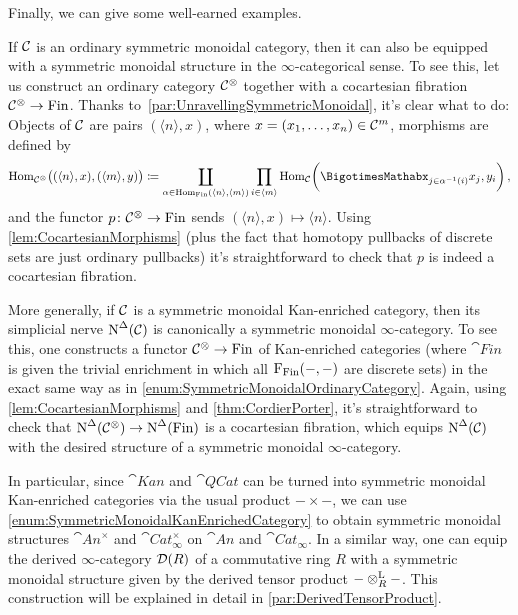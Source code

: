 \begin{exm}\label{exm:SymmetricMonoidal}
	Finally, we can give some well-earned examples.
	\begin{alphanumerate}
		\item If $\mathcal{C}$ is an ordinary symmetric monoidal category, then it can also be equipped with a symmetric monoidal structure in the $\infty$-categorical sense. To see this, let us construct an ordinary category $\mathcal{C}^\otimes$ together with a cocartesian fibration $\mathcal{C}^\otimes\rightarrow \mathrm{Fin}$. Thanks to~\cref{par:UnravellingSymmetricMonoidal}, it's clear what to do: Objects of $\mathcal{C}$ are pairs $(\langle n\rangle, x)$, where $x=(x_1,\dotsc,x_n)\in \mathcal{C}^m$, morphisms are defined by\label{enum:SymmetricMonoidalOrdinaryCategory}
		\begin{equation*}
			\Hom_{\Cc^\otimes}\bigl((\langle n\rangle,x),(\langle m\rangle,y)\bigr)\coloneqq \coprod_{\alpha\in \Hom_{\cat{Fin}}(\langle n\rangle,\langle m\rangle)}\prod_{i\in\langle m\rangle}\Hom_\Cc\biggl(\bigotimes_{j\in\alpha^{-1}(i)}x_j,y_i\biggr)\,,
		\end{equation*}
		and the functor $p\colon \mathcal{C}^\otimes\rightarrow \mathrm{Fin}$ sends $(\langle n\rangle ,x)\mapsto \langle n\rangle$. Using \cref{lem:CocartesianMorphisms} (plus the fact that homotopy pullbacks of discrete sets are just ordinary pullbacks) it's straightforward to check that $p$ is indeed a cocartesian fibration.
		\item More generally, if $\mathcal{C}$ is a symmetric monoidal Kan-enriched category, then its simplicial nerve $\operatorname{N}^\Delta(\mathcal{C})$ is canonically a symmetric monoidal $\infty$-category. To see this, one constructs a functor $\mathcal{C}^\otimes\rightarrow \mathrm{Fin}$ of Kan-enriched categories (where $\cat{Fin}$ is given the trivial enrichment in which all $\operatorname{F}_{\mathrm{Fin}}(-,-)$ are discrete sets) in the exact same way as in \cref{enum:SymmetricMonoidalOrdinaryCategory}. Again, using \cref{lem:CocartesianMorphisms} and \cref{thm:CordierPorter}, it's straightforward to check that $\operatorname{N}^\Delta(\mathcal{C}^\otimes)\rightarrow \operatorname{N}^\Delta(\mathrm{Fin})$ is a cocartesian fibration, which equips $\operatorname{N}^\Delta(\mathcal{C})$ with the desired structure of a symmetric monoidal $\infty$-category.\label{enum:SymmetricMonoidalKanEnrichedCategory}
		\item In particular, since $\cat{Kan}$ and $\cat{QCat}$ can be turned into symmetric monoidal Kan-enriched categories via the usual product $-\times -$, we can use \cref{enum:SymmetricMonoidalKanEnrichedCategory} to obtain symmetric monoidal structures $\cat{An}^\times$ and $\cat{Cat}_\infty^\times$ on $\cat{An}$ and $\cat{Cat}_\infty$. In a similar way, one can equip the derived $\infty$-category $\mathcal{D}(R)$ of a commutative ring $R$ with a symmetric monoidal structure given by the derived tensor product $-\otimes_R^{\mathrm{L}}-$. This construction will be explained in detail in \cref{par:DerivedTensorProduct}.
		

\end{alphanumerate}
\end{exm}
